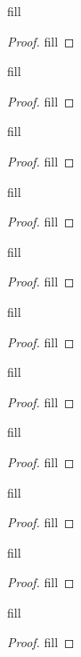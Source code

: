 \begin{exercise}{33}
fill
\end{exercise}
\begin{proof}
fill
\end{proof} 

\begin{exercise}{36}
fill
\end{exercise}
\begin{proof}
fill
\end{proof} 

\begin{exercise}{37}
fill
\end{exercise}
\begin{proof}
fill
\end{proof} 

\begin{exercise}{38}
fill
\end{exercise}
\begin{proof}
fill
\end{proof} 

\begin{exercise}{40}
fill
\end{exercise}
\begin{proof}
fill
\end{proof} 

\begin{exercise}{42}
fill
\end{exercise}
\begin{proof}
fill
\end{proof} 

\begin{exercise}{43}
fill
\end{exercise}
\begin{proof}
fill
\end{proof} 

\begin{exercise}{46}
fill
\end{exercise}
\begin{proof}
fill
\end{proof} 

\begin{exercise}{47}
fill
\end{exercise}
\begin{proof}
fill
\end{proof} 

\begin{exercise}{48}
fill
\end{exercise}
\begin{proof}
fill
\end{proof} 

\begin{exercise}{49}
fill
\end{exercise}
\begin{proof}
fill
\end{proof} 